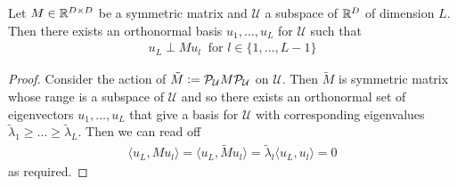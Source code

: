 \begin{lemma}\label{lem:clever-basis-choice-for-orthogonality}
Let $M \in \mathbb{R}^{D \times D}$ be a symmetric matrix and $\mathcal{U}$ a subspace of $\mathbb{R}^D$ of dimension $L$.
Then there exists an orthonormal basis $u_1, \dots, u_L$ for $\mathcal{U}$ such that
\begin{align*}
    u_L \perp M u_l \: \text{ for } l \in \{1, \dots, L-1 \}
\end{align*}
\end{lemma}
\begin{proof}
    Consider the action of $\tilde{M} \vcentcolon= \mathcal{P}_\mathcal{U} M \mathcal{P}_\mathcal{U}$ on $\mathcal{U}$.
    Then $\tilde{M}$ is symmetric matrix whose range is a subspace of $\mathcal{U}$  and so there exists an orthonormal set of eigenvectors $u_1, \dots, u_L$ that give a basis for $\mathcal{U}$ with corresponding eigenvalues $\tilde{\lambda}_1 \geq \dots \geq \tilde{\lambda}_L$.
    Then we can read off
    \begin{align*}
        \langle u_L, M u_l \rangle = \langle u_L, \tilde{M} u_l \rangle = \tilde{\lambda}_l \langle u_L, u_l \rangle = 0
    \end{align*}
    as required.
\end{proof}

